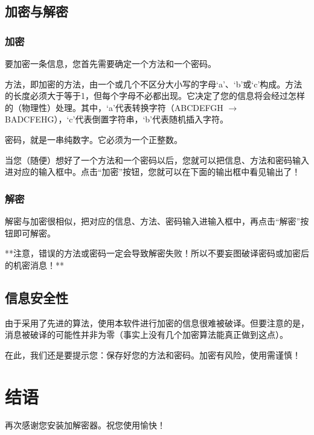 \documentclass{article}
\begin{document}
\subsection{加密与解密}

\subsubsection{加密}

要加密一条信息，您首先需要确定一个方法和一个密码。

方法，即加密的方法，由一个或几个不区分大小写的字母‘a’、‘b’或‘c’构成。方法的长度必须大于等于1，但每个字母不必都出现。它决定了您的信息将会经过怎样的（物理性）处理。其中，‘a’代表转换字符（ABCDEFGH $\rightarrow$ BADCFEHG），‘c’代表倒置字符串，‘b’代表随机插入字符。

密码，就是一串纯数字。它必须为一个正整数。

当您（随便）想好了一个方法和一个密码以后，您就可以把信息、方法和密码输入进对应的输入框中。点击“加密”按钮，您就可以在下面的输出框中看见输出了！

\subsubsection{解密}

解密与加密很相似，把对应的信息、方法、密码输入进输入框中，再点击“解密”按钮即可解密。

**注意，错误的方法或密码一定会导致解密失败！所以不要妄图破译密码或加密后的机密消息！**

\subsection{信息安全性}

由于采用了先进的算法，使用本软件进行加密的信息很难被破译。但要注意的是，消息被破译的可能性并非为零（事实上没有几个加密算法能真正做到这点）。

在此，我们还是要提示您：保存好您的方法和密码。加密有风险，使用需谨慎！

\section{结语}

再次感谢您安装加解密器。祝您使用愉快！
\end{document}
